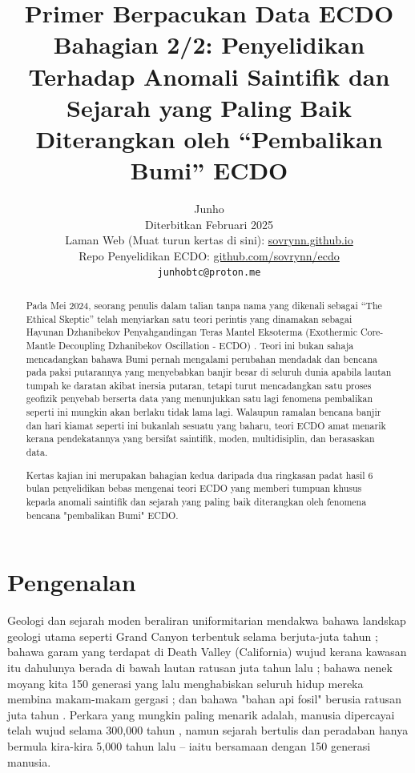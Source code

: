\documentclass[10pt,twocolumn,letterpaper]{article}
\begin{document}
\title{Primer Berpacukan Data ECDO Bahagian 2/2: Penyelidikan Terhadap Anomali Saintifik dan Sejarah yang Paling Baik Diterangkan oleh “Pembalikan Bumi” ECDO}

\author{Junho\\
Diterbitkan Februari 2025\\
Laman Web (Muat turun kertas di sini): \href{https://sovrynn.github.io}{sovrynn.github.io}\\
Repo Penyelidikan ECDO: \href{https://github.com/sovrynn/ecdo}{github.com/sovrynn/ecdo}\\
{\tt\small junhobtc@proton.me}
}

\maketitle

\begin{abstract}
Pada Mei 2024, seorang penulis dalam talian tanpa nama yang dikenali sebagai “The Ethical Skeptic” \cite{0} telah menyiarkan satu teori perintis yang dinamakan sebagai Hayunan Dzhanibekov Penyahgandingan Teras Mantel Eksoterma (Exothermic Core-Mantle Decoupling
Dzhanibekov Oscillation - ECDO) \cite{1}. Teori ini bukan sahaja mencadangkan bahawa Bumi pernah mengalami perubahan mendadak dan bencana pada paksi putarannya yang menyebabkan banjir besar di seluruh dunia apabila lautan tumpah ke daratan akibat inersia putaran, tetapi turut mencadangkan satu proses geofizik penyebab berserta data yang menunjukkan satu lagi fenomena pembalikan seperti ini mungkin akan berlaku tidak lama lagi. Walaupun ramalan bencana banjir dan hari kiamat seperti ini bukanlah sesuatu yang baharu, teori ECDO amat menarik kerana pendekatannya yang bersifat saintifik, moden, multidisiplin, dan berasaskan data.

Kertas kajian ini merupakan bahagian kedua daripada dua ringkasan padat hasil 6 bulan penyelidikan bebas \cite{2,20} mengenai teori ECDO yang memberi tumpuan khusus kepada anomali saintifik dan sejarah yang paling baik diterangkan oleh fenomena bencana "pembalikan Bumi" ECDO.

\end{abstract}

\section{Pengenalan}

Geologi dan sejarah moden beraliran uniformitarian mendakwa bahawa landskap geologi utama seperti Grand Canyon terbentuk selama berjuta-juta tahun \cite{143}; bahawa garam yang terdapat di Death Valley (California) wujud kerana kawasan itu dahulunya berada di bawah lautan ratusan juta tahun lalu \cite{144}; bahawa nenek moyang kita 150 generasi yang lalu menghabiskan seluruh hidup mereka membina makam-makam gergasi \cite{29,70}; dan bahawa "bahan api fosil" berusia ratusan juta tahun \cite{104}. Perkara yang mungkin paling menarik adalah, manusia dipercayai telah wujud selama 300,000 tahun \cite{145}, namun sejarah bertulis dan peradaban hanya bermula kira-kira 5,000 tahun lalu – iaitu bersamaan dengan 150 generasi manusia.
\end{document}
